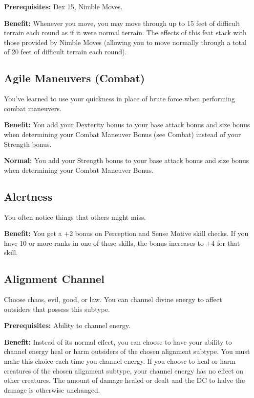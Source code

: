 \textbf{Prerequisites:} Dex 15, Nimble Moves.
				
\textbf{Benefit:} Whenever you move, you may move through up to 15 feet of difficult terrain each round as if it were normal terrain. The effects of this feat stack with those provided by Nimble Moves (allowing you to move normally through a total of 20 feet of difficult terrain each round).
				
\subsection{Agile Maneuvers (Combat)}

				
You've learned to use your quickness in place of brute force when performing combat maneuvers.
				
\textbf{Benefit:} You add your Dexterity bonus to your base attack bonus and size bonus when determining your Combat Maneuver Bonus (see Combat) instead of your Strength bonus.
				
\textbf{Normal:} You add your Strength bonus to your base attack bonus and size bonus when determining your Combat Maneuver Bonus.
				
\subsection{Alertness}

				
You often notice things that others might miss.
				
\textbf{Benefit:} You get a +2 bonus on Perception and Sense Motive skill checks. If you have 10 or more ranks in one of these skills, the bonus increases to +4 for that skill.
				
\subsection{Alignment Channel}

				
Choose chaos, evil, good, or law. You can channel divine energy to affect outsiders that possess this subtype.
				
\textbf{Prerequisites:} Ability to channel energy.
				
\textbf{Benefit:} Instead of its normal effect, you can choose to have your ability to channel energy heal or harm outsiders of the chosen alignment subtype. You must make this choice each time you channel energy. If you choose to heal or harm creatures of the chosen alignment subtype, your channel energy has no effect on other creatures. The amount of damage healed or dealt and the DC to halve the damage is otherwise unchanged.
				

